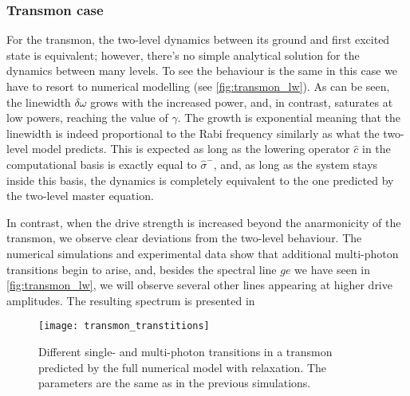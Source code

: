 \subsubsection{Transmon case}

For the transmon, the two-level dynamics between its ground and first excited state is equivalent; however, there's no simple analytical solution for the dynamics between many levels. To see the behaviour is the same in this case we have to resort to numerical modelling (see \autoref{fig:transmon_lw}). As can be seen, the linewidth $\delta\omega$ grows with the increased power, and, in contrast, saturates at low powers, reaching the value of $\gamma$. The growth is exponential meaning that the linewidth is indeed proportional to the Rabi frequency similarly as what the two-level model predicts. This is expected as long as the lowering operator $\hat c$ in the computational basis is exactly equal to $\hat \sigma^-$, and, as long as the system stays inside this basis, the dynamics is completely equivalent to the one predicted by the two-level master equation. 

In contrast, when the drive strength is increased beyond the anarmonicity of the transmon, we observe clear deviations from the two-level behaviour. The numerical simulations and experimental data show that additional multi-photon transitions begin to arise, and, besides the spectral line $ge$ we have seen in \autoref{fig:transmon_lw}, we will observe several other lines appearing at higher drive amplitudes. The resulting spectrum is presented in  

\begin{figure}
\centering
\texttt{[image: transmon\_transtitions]}
\caption{Different single- and multi-photon transitions in a transmon predicted by the full numerical model with relaxation. The parameters are the same as in the previous simulations.}
\end{figure}